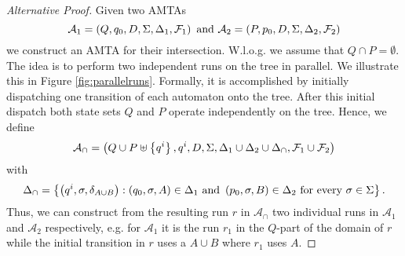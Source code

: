 \begin{proof}[Alternative Proof]
  Given two \acp{AMTA}
  \begin{equation*}
    \mathcal{A}_{1} = \left(Q, q_{0}, D, \Sigma, \Delta_{1}, \mathcal{F}_{1}\right)
      \text{ and }
    \mathcal{A}_{2} = \left(P, p_{0}, D, \Sigma, \Delta_{2}, \mathcal{F}_{2}\right)
  \end{equation*}
  we construct an \ac{AMTA} for their intersection. W.l.o.g. we assume that 
  $Q\cap P = \emptyset$. The idea is to perform two independent runs on the 
  tree in parallel. We illustrate this in Figure \ref{fig:parallelruns}. 
  Formally, it is accomplished by initially dispatching one transition of each 
  automaton onto the tree. After this initial dispatch both state sets $Q$ and
  $P$ operate independently on the tree. Hence, we define
  \begin{equation*}
    \mathcal{A}_{\cap} = \left(
      Q\cup P\uplus\left\{q^{i}\right\}, q^{i}, D, \Sigma, 
      \Delta_{1}\cup\Delta_{2}\cup\Delta_{\cap}, 
      \mathcal{F}_{1}\cup\mathcal{F}_{2}
    \right)
  \end{equation*}
  with
  \begin{equation*}
    \Delta_{\cap} = \left\{
      \left(q^{i},\sigma,\delta_{A\cup B}\right):
        \left(q_{0},\sigma,A\right)\in\Delta_{1}
      \text{ and }
        \left(p_{0},\sigma,B\right)\in\Delta_{2}
      \text{ for every }
        \sigma\in\Sigma
    \right\}.
  \end{equation*}
  Thus, we can construct from the resulting run $r$ in $\mathcal{A}_{\cap}$ two
  individual runs in $\mathcal{A}_{1}$ and $\mathcal{A}_{2}$ respectively, e.g.
  for $\mathcal{A}_{1}$ it is the run $r_{1}$ in the $Q$-part of the domain of 
  $r$ while the initial transition in $r$ uses a $A\cup B$ where $r_{1}$ uses 
  $A$.
\end{proof}

